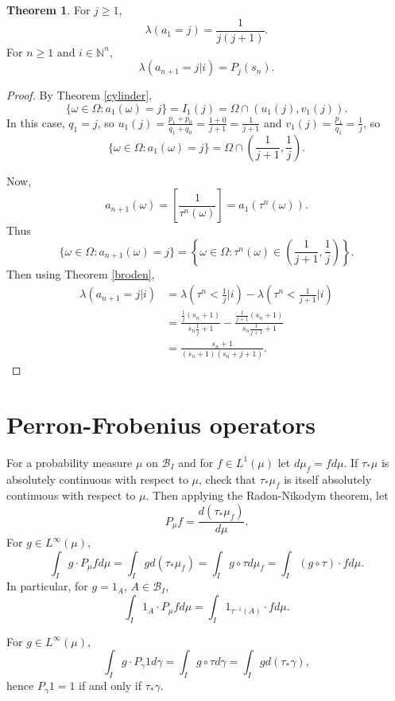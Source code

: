 \documentclass{article}
\theoremstyle{definition}
\newtheorem{theorem}{Theorem}
\theoremstyle{definition}
\begin{document}
\begin{theorem}
For $j \geq 1$,
\[
\lambda(a_1=j) = \frac{1}{j(j+1)}.
\]
For $n \geq 1$ and $i \in \mathbb{N}^n$,
\[
\lambda(a_{n+1}=j | i) = P_j(s_n).
\]
\end{theorem}
\begin{proof}
By Theorem \ref{cylinder},
\[
\{\omega \in \Omega: a_1(\omega)=j\} = I_1(j) = \Omega \cap (u_1(j), v_1(j)).
\]
In this case, $q_1=j$, so $u_1(j) = \frac{p_1+p_0}{q_1+q_0}=\frac{1+0}{j+1}
=\frac{1}{j+1}$ and
$v_1(j) = \frac{p_1}{q_1} = \frac{1}{j}$, so 
\[
\{\omega \in \Omega: a_1(\omega)=j\} = \Omega \cap \left(\frac{1}{j+1}, \frac{1}{j} \right).
\]

Now,
\[
a_{n+1}(\omega) = \left[ \frac{1}{\tau^n(\omega)} \right]
=a_1(\tau^n(\omega)).
\]
Thus
\[
\{\omega \in \Omega: a_{n+1}(\omega)=j\}
=\left\{\omega \in \Omega: \tau^n(\omega) \in \left(\frac{1}{j+1},\frac{1}{j}\right)\right\}.
\]
Then using Theorem \ref{broden},
\begin{align*}
\lambda(a_{n+1}=j|i)& = \lambda\left( \tau^n < \frac{1}{j} \big| i \right)-\lambda\left( \tau^n < \frac{1}{j+1} \big| i \right)\\
&=\frac{\frac{1}{j}(s_n+1)}{s_n \frac{1}{j} + 1}-\frac{\frac{1}{j+1}(s_n+1)}{s_n \frac{1}{j+1} + 1}\\
&=\frac{s_n+1}{(s_n+1)(s_n+j+1)}.
\end{align*}
\end{proof}



\section{Perron-Frobenius operators}
For a probability measure $\mu$ on $\mathscr{B}_I$ and for $f \in L^1(\mu)$ let
$d\mu_f = f d\mu$. 
If $\tau_*\mu$ is
absolutely continuous with respect to $\mu$, check that
$\tau_* \mu_f$ is itself absolutely continuous with respect to $\mu$. Then
applying the Radon-Nikodym theorem, let
\[
P_\mu f = \frac{d(\tau_* \mu_f)}{d\mu}.
\]
For $g \in L^\infty(\mu)$,
\[
\int_I g \cdot P_\mu f d\mu=\int_I g d(\tau_* \mu_f)
=\int_I g \circ \tau d\mu_f
=\int_I (g \circ \tau) \cdot f d\mu.
\]
In particular, for $g = 1_A$, $A \in \mathscr{B}_I$,
\[
\int_I 1_A \cdot P_\mu f d\mu = \int_I 1_{\tau^{-1}(A)} \cdot f d\mu.
\]


For $g \in L^\infty(\mu)$,
\[
\int_I g \cdot P_\gamma 1 d\gamma = \int_I g \circ \tau d\gamma
=\int_I g d(\tau_* \gamma),
\]
hence $P_\gamma 1 = 1$ if and only if $\tau_* \gamma$. 
\end{document}
